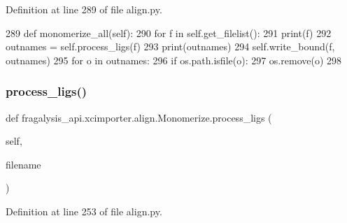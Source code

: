 Definition at line 289 of file align.\+py.


\begin{DoxyCode}
289     \textcolor{keyword}{def }monomerize\_all(self):
290         \textcolor{keywordflow}{for} f \textcolor{keywordflow}{in} self.get\_filelist():
291             print(f)
292             outnames = self.process\_ligs(f)
293             print(outnames)
294             self.write\_bound(f, outnames)
295             \textcolor{keywordflow}{for} o \textcolor{keywordflow}{in} outnames:
296                 \textcolor{keywordflow}{if} os.path.isfile(o):
297                     os.remove(o)
298 \end{DoxyCode}
\mbox{\label{classfragalysis__api_1_1xcimporter_1_1align_1_1_monomerize_a182c0cf1af3303f6c13d5160c6c0ff8e}} 
\subsubsection{\texorpdfstring{process\+\_\+ligs()}{process\_ligs()}}
{\footnotesize\ttfamily def fragalysis\+\_\+api.\+xcimporter.\+align.\+Monomerize.\+process\+\_\+ligs (\begin{DoxyParamCaption}\item[{}]{self,  }\item[{}]{filename }\end{DoxyParamCaption})}



Definition at line 253 of file align.\+py.


